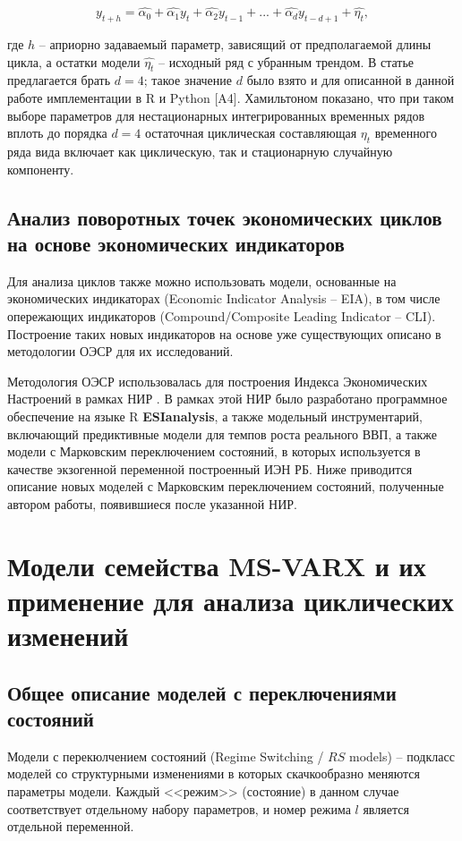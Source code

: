 \documentclass[a4paper,14pt]{extreport}
\begin{document}
	\begin{equation}
	y_{t+h} = \hat{\alpha_{0}} + \hat{\alpha_{1}}y_{t} + \hat{\alpha_{2}}y_{t-1}
	+ ... + \hat{\alpha_{d}}y_{t-d+1} + \hat{\eta_{t}},
	\end{equation}
	
	где $h$ – априорно задаваемый параметр, зависящий от предполагаемой длины цикла, а остатки модели $\hat{\eta_{t}}$ – исходный ряд с убранным трендом. В статье предлагается брать $d=4$; такое значение $d$ было взято и для описанной в данной работе имплементации в R и Python [A4]. \iffalse \cite{makarevich_bsu_conf_2017}.\fi Хамильтоном показано, что при таком выборе параметров для нестационарных интегрированных временных рядов вплоть до порядка $d=4$ остаточная циклическая составляющая $\eta_{t}$ временного ряда вида включает как циклическую, так и стационарную случайную компоненту. 
	
	
	\subsection{Анализ поворотных точек экономических циклов на основе экономических индикаторов}
	
	Для анализа циклов также можно использовать модели, основанные на экономических индикаторах (Economic Indicator Analysis – EIA), в том числе опережающих индикаторов (Compound/Composite Leading Indicator – CLI). Построение таких новых индикаторов на основе уже существующих описано в методологии ОЭСР \cite{oecdCLI} для их исследований. 
	
	Методология ОЭСР использовалась для построения Индекса Экономических Настроений в рамках НИР \cite{esiMaking}. В рамках этой НИР было разработано программное обеспечение на языке R \textbf{ESIanalysis}, а также модельный инструментарий, включающий предиктивные модели для темпов роста реального ВВП, а также модели с Марковским переключением состояний, в которых используется в качестве экзогенной переменной построенный ИЭН РБ. Ниже приводится описание новых моделей с Марковским переключением состояний, полученные автором работы, появившиеся после указанной НИР.
	
	
	\section{Модели семейства MS-VARX и их применение для анализа циклических изменений}
	
	\subsection{Общее описание моделей с переключениями состояний}
	Модели с перекюлчением состояний (Regime Switching / $RS$ models) – подкласс моделей со структурными изменениями в которых скачкообразно меняются параметры модели. Каждый <<режим>> (состояние) в данном случае соответствует отдельному набору параметров, и номер режима $l$ является отдельной переменной.
	
\end{document}
